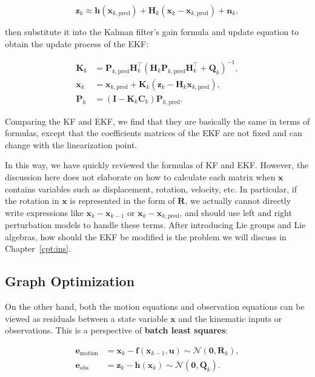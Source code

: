 \begin{equation}
	\mathbf{z}_k \approx \mathbf{h}(\mathbf{x}_{k, \text{pred}}) + \mathbf{H}_k (\mathbf{x}_k - \mathbf{x}_{k, \text{pred}}) + \mathbf{n}_k,
\end{equation}

then substitute it into the Kalman filter's gain formula and update equation to obtain the update process of the EKF:

\begin{mdframed}
\begin{align}
\mathbf{K}_k &= \mathbf{P}_{k, \text{pred}} \mathbf{H}_k^\top (\mathbf{H}_k \mathbf{P}_{k, \text{pred}} \mathbf{H}_k^\top + \mathbf{Q}_k)^{-1}, \\
\mathbf{x}_k &= \mathbf{x}_{k, \text{pred}} + \mathbf{K}_k (\mathbf{z}_k - \mathbf{H}_k \mathbf{x}_{k, \text{pred}}), \\
\mathbf{P}_k &= (\mathbf{I} - \mathbf{K}_k \mathbf{C}_k) \mathbf{P}_{k, \text{pred}}.
\end{align}
\end{mdframed}

Comparing the KF and EKF, we find that they are basically the same in terms of formulas, except that the coefficients matrices of the EKF are not fixed and can change with the linearization point.

In this way, we have quickly reviewed the formulas of KF and EKF. However, the discussion here does not elaborate on how to calculate each matrix when $\mathbf{x}$ contains variables such as displacement, rotation, velocity, etc. In particular, if the rotation in $\mathbf{x}$ is represented in the form of $\mathbf{R}$, we actually cannot directly write expressions like $\mathbf{x}_k - \mathbf{x}_{k-1}$ or $\mathbf{x}_k - \mathbf{x}_{k, \text{pred}}$, and should use left and right perturbation models to handle these terms. After introducing Lie groups and Lie algebras, how should the EKF be modified is the problem we will discuss in Chapter~\ref{cpt:ins}.

\subsection{Graph Optimization}

On the other hand, both the motion equations and observation equations can be viewed as residuals between a state variable $\mathbf{x}$ and the kinematic inputs or observations. This is a perspective of \textbf{batch least squares}:

\begin{align}\label{eq:2.118}
	\mathbf{e}_{\text{motion}} &= \mathbf{x}_k - \mathbf{f}(\mathbf{x}_{k-1}, \mathbf{u}) \sim \mathcal{N}(\mathbf{0}, \mathbf{R}_k), \\
	\mathbf{e}_{\text{obs}} &= \mathbf{z}_k - \mathbf{h}(\mathbf{x}_k) \sim \mathcal{N}(\mathbf{0}, \mathbf{Q}_k).
\end{align}

